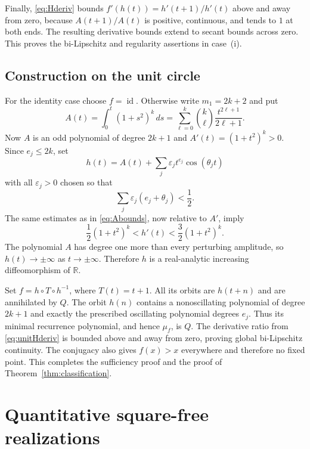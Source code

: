 \documentclass[11pt,letterpaper]{article}
\theoremstyle{definition}
\theoremstyle{remark}
\newcommand{\R}{\mathbb R}
\newcommand{\id}{\operatorname{id}}
\begin{document}
Finally, \eqref{eq:Hderiv} bounds
$f'(h(t))=h'(t+1)/h'(t)$ above and away from zero, because
$A(t+1)/A(t)$ is positive, continuous, and tends to $1$ at both ends.
The resulting derivative bounds extend to secant bounds across zero.
This proves the bi-Lipschitz and regularity assertions in case~(i).

\subsection{Construction on the unit circle}
\label{sec:construction-unit}

For the identity case choose $f=\id$. Otherwise write $m_1=2k+2$ and
put
\begin{equation}
 A(t)=\int_0^t(1+s^2)^k\,ds
  =\sum_{\ell=0}^k\binom{k}{\ell}\frac{t^{2\ell+1}}{2\ell+1}.
 \label{eq:unitA}
\end{equation}
Now $A$ is an odd polynomial of degree $2k+1$ and
$A'(t)=(1+t^2)^k>0$. Since $e_j\le2k$, set
\begin{equation}
  h(t)=A(t)+\sum_j\varepsilon_jt^{e_j}\cos(\theta_jt)
  \label{eq:unitH}
\end{equation}
with all $\varepsilon_j>0$ chosen so that
\begin{equation}
 \sum_j\varepsilon_j(e_j+\theta_j)<\frac12.
 \label{eq:eps-unit}
\end{equation}
The same estimates as in \eqref{eq:Abounds}, now relative to $A'$, imply
\begin{equation}
 \frac12(1+t^2)^k<h'(t)<\frac32(1+t^2)^k.
 \label{eq:unitHderiv}
\end{equation}
The polynomial $A$ has degree one more than every perturbing amplitude,
so $h(t)\to\pm\infty$ as $t\to\pm\infty$. Therefore $h$ is a
real-analytic increasing diffeomorphism of $\R$.

Set $f=h\circ T\circ h^{-1}$, where $T(t)=t+1$.
All its orbits are $h(t+n)$ and are annihilated by $Q$.
The orbit $h(n)$ contains a nonoscillating polynomial of degree $2k+1$
and exactly the prescribed oscillating polynomial degrees $e_j$.
Thus its minimal recurrence polynomial, and hence $\mu_f$, is $Q$.
The derivative ratio from \eqref{eq:unitHderiv} is bounded above and
away from zero, proving global bi-Lipschitz continuity. The conjugacy
also gives $f(x)>x$ everywhere and therefore no fixed point.
This completes the sufficiency proof and the proof of
Theorem~\ref{thm:classification}.

\section{Quantitative square-free realizations}
\label{sec:squarefree}
\end{document}
